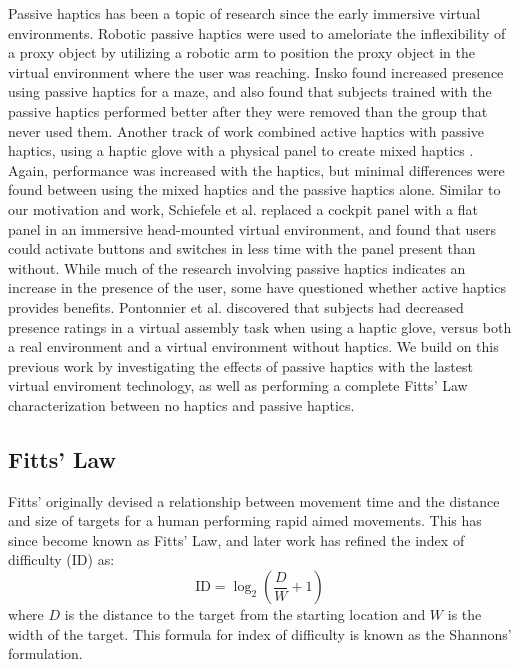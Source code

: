 Passive haptics has been a topic of research since the early immersive virtual environments.
Robotic passive haptics were used to ameloriate the inflexibility of a proxy object by utilizing a robotic arm to position the proxy object in the virtual environment where the user was reaching\cite{tachi_construction_1994,mcneely_robotic_1993}.
Insko\cite{insko_passive_2001} found increased presence using passive haptics for a maze, and also found that subjects trained with the passive haptics performed better after they were removed than the group that never used them.
Another track of work combined active haptics with passive haptics, using a haptic glove with a physical panel to create mixed haptics \cite{borst_evaluation_2005}.
Again, performance was increased with the haptics, but minimal differences were found between using the mixed haptics and the passive haptics alone.
Similar to our motivation and work, Schiefele et al.\cite{schiefele_simple_1998} replaced a cockpit panel with a flat panel in an immersive head-mounted virtual environment, and found that users could activate buttons and switches in less time with the panel present than without.
While much of the research involving passive haptics indicates an increase in the presence of the user, some have questioned whether active haptics provides benefits.
Pontonnier et al.\cite{pontonnier_designing_2014} discovered that subjects had decreased presence ratings in a virtual assembly task when using a haptic glove, versus both a real environment and a virtual environment without haptics.
We build on this previous work by investigating the effects of passive haptics with the lastest virtual enviroment technology, as well as performing a complete Fitts' Law characterization between no haptics and passive haptics.

\subsection{Fitts' Law}

Fitts' originally devised a relationship between movement time and the distance and size of targets for a human performing rapid aimed movements\cite{fitts_information_1954}.
This has since become known as Fitts' Law, and later work has refined the index of difficulty ($\mathrm{ID}$) as:
\begin{equation}
    \mathrm{ID}=\log_2\left(\frac{D}{W}+1\right)
    \label{eq:index_of_difficulty}
\end{equation}
where $D$ is the distance to the target from the starting location and $W$ is the width of the target.
This formula for index of difficulty is known as the Shannons' formulation\cite{mackenzie_note_1989}.

